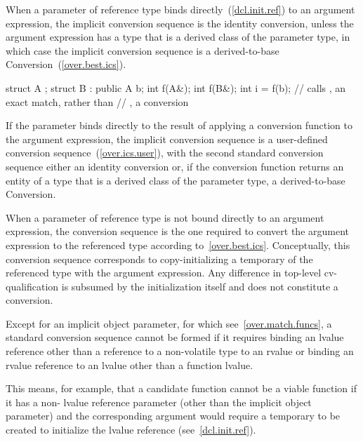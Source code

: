 \pnum
When a parameter of reference type binds directly~(\ref{dcl.init.ref}) to an
argument expression, the implicit conversion sequence is the identity conversion,
unless the argument expression has a type that is a derived class of the parameter
type, in which case the implicit conversion sequence is a derived-to-base
Conversion~(\ref{over.best.ics}).
\begin{example}

\begin{codeblock}
struct A {};
struct B : public A {} b;
int f(A&);
int f(B&);
int i = f(b);                   // calls , an exact match, rather than
                                // , a conversion
\end{codeblock}
\end{example}
If the parameter binds directly to the result of
applying a conversion function to the argument expression, the implicit
conversion sequence is a user-defined conversion sequence~(\ref{over.ics.user}),
with the second standard conversion sequence either an identity conversion or,
if the conversion function returns an entity of a type that is a derived class
of the parameter type, a derived-to-base Conversion.

\pnum
When a parameter of reference type is not bound directly to an argument
expression, the conversion sequence is the one required to convert the argument
expression to the referenced type according to~\ref{over.best.ics}.
Conceptually, this conversion sequence corresponds to copy-initializing a
temporary of the referenced type with the argument expression.
Any difference
in top-level cv-qualification is subsumed by the initialization itself and
does not constitute a conversion.

\pnum
Except for an implicit object parameter, for which see~\ref{over.match.funcs}, a
standard conversion sequence cannot be formed if it requires
binding an lvalue reference
other than a reference to a non-volatile  type
to an rvalue
or binding an rvalue reference to an lvalue other than a function lvalue.
\begin{note}
This means, for example, that a candidate function cannot be a viable
function if it has a non- lvalue reference parameter (other than
the implicit object parameter) and the corresponding argument
would require a temporary to be created to initialize the lvalue
reference (see~\ref{dcl.init.ref}).
\end{note}

